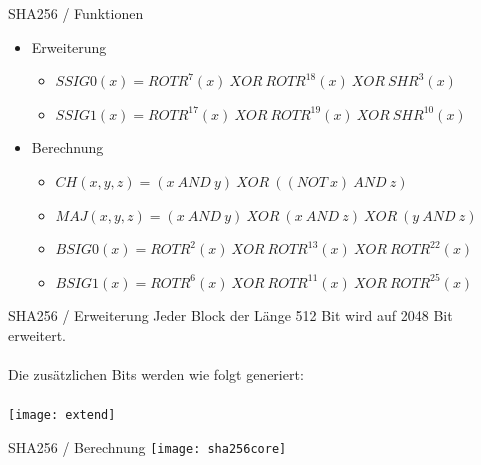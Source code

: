 \documentclass{beamer}
\begin{document}
    \begin{frame}{SHA256 / Funktionen}
      \begin{itemize}
      \setlength{\itemsep}{20pt}
      \item Erweiterung
        \begin{itemize}
          \setlength{\itemsep}{10pt}
          \item $ SSIG0(x) = ROTR^{7}(x)~XOR~ROTR^{18}(x)~XOR~SHR^{3}(x) $
          \item $ SSIG1(x) = ROTR^{17}(x)~XOR~ROTR^{19}(x)~XOR~SHR^{10}(x) $
        \end{itemize}
      \item Berechnung
        \begin{itemize}
          \setlength{\itemsep}{10pt}
          \item $ CH( x, y, z) = (x~AND~y)~XOR~( (NOT~x)~AND~z) $
          \item $ MAJ( x, y, z) = (x~AND~y)~XOR~(x~AND~z)~XOR~(y~AND~z) $
          \item $ BSIG0(x) = ROTR^{2}(x)~XOR~ROTR^{13}(x)~XOR~ROTR^{22}(x) $
          \item $ BSIG1(x) = ROTR^{6}(x)~XOR~ROTR^{11}(x)~XOR~ROTR^{25}(x) $
        \end{itemize}
      \end{itemize}
    \end{frame}
    \begin{frame}{SHA256 / Erweiterung}
      Jeder Block der Länge 512 Bit wird auf 2048 Bit erweitert.\\
      ~\\
      Die zusätzlichen Bits werden wie folgt generiert:\\
      ~\\
      \texttt{[image: extend]}
    \end{frame}
    \begin{frame}{SHA256 / Berechnung}
      \texttt{[image: sha256core]}
    \end{frame}
\end{document}
